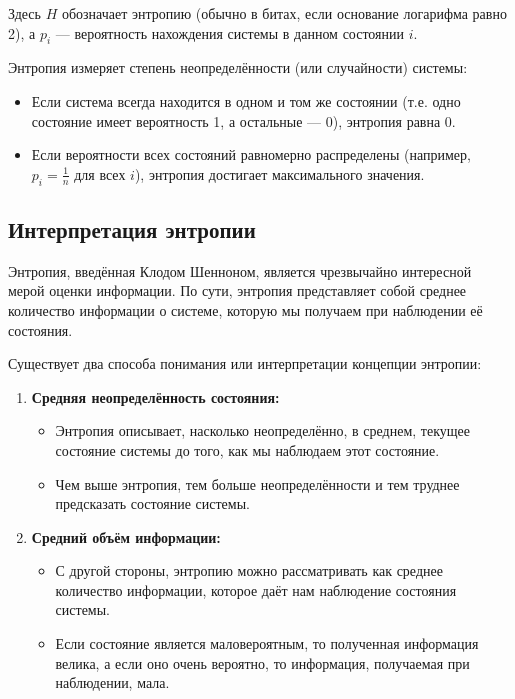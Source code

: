 \documentclass[12pt,a4paper]{article}
\newenvironment{rembox}[1][]{%
  \begin{tcolorbox}[enhanced, breakable, colback=gray!5, colframe=gray!50, title=#1, fonttitle=\bfseries, arc=3pt, boxrule=0.5pt]
}{\end{tcolorbox}}
\begin{document}
Здесь $H$ обозначает энтропию (обычно в битах, если основание логарифма равно 2), а $p_i$ — вероятность нахождения системы в данном состоянии $i$.

\begin{rembox}[Физический смысл энтропии]
Энтропия измеряет степень неопределённости (или случайности) системы: 
\begin{itemize}
    \item Если система всегда находится в одном и том же состоянии (т.е. одно состояние имеет вероятность 1, а остальные — 0), энтропия равна $0$.
    \item Если вероятности всех состояний равномерно распределены (например, $p_i = \frac{1}{n}$ для всех $i$), энтропия достигает максимального значения.
\end{itemize}
\end{rembox}
\subsection{Интерпретация энтропии}

Энтропия, введённая Клодом Шенноном, является чрезвычайно интересной мерой оценки информации. По сути, энтропия представляет собой среднее количество информации о системе, которую мы получаем при наблюдении её состояния.

\begin{rembox}[Две интерпретации энтропии]
Существует два способа понимания или интерпретации концепции энтропии:
\begin{enumerate}
    \item \textbf{Средняя неопределённость состояния:} 
    \begin{itemize}
        \item Энтропия описывает, насколько неопределённо, в среднем, текущее состояние системы до того, как мы наблюдаем этот состояние.
        \item Чем выше энтропия, тем больше неопределённости и тем труднее предсказать состояние системы.
    \end{itemize}
    \item \textbf{Средний объём информации:}
    \begin{itemize}
        \item С другой стороны, энтропию можно рассматривать как среднее количество информации, которое даёт нам наблюдение состояния системы.
        \item Если состояние является маловероятным, то полученная информация велика, а если оно очень вероятно, то информация, получаемая при наблюдении, мала.
    \end{itemize}
\end{enumerate}
\end{rembox}
\end{document}
